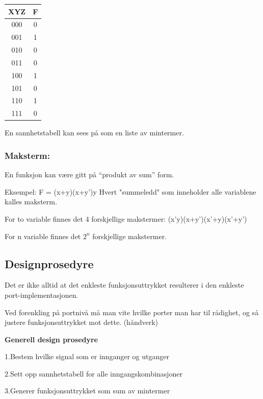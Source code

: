 \documentclass{article}
\begin{document}
	
	\begin{center}
		\begin{tabular}{|c|c|}
			\hline
			XYZ & F \\ \hline
			000 & 0  \\ \hline
			001 & \color{Aquamarine}1  \\ \hline 
			010 & 0  \\ \hline
			011 & 0  \\ \hline 
			100 & \color{BurntOrange}1  \\ \hline
			101 & 0  \\ \hline
			110 & \color{WildStrawberry}1  \\ \hline
			111 & 0  \\ \hline
			
		\end{tabular}
	\end{center}
	
	En sannhetstabell kan sees på som en liste av mintermer.
	
	\subsubsection{Maksterm:}
	
	En funksjon kan være gitt på “produkt av sum” form.
	
	Eksempel: F = (x+y)(x+y')y 
	Hvert "summeledd" som inneholder alle variablene kalles maksterm.
	
	For to variable finnes det 4 forskjellige makstermer:
	(x'y)(x+y')(x'+y)(x'+y')
	
	For n variable finnes det $2^n$ forskjellige makstermer.
	
	\subsection{Designprosedyre }
	
	Det er ikke alltid at det enkleste funksjonsuttrykket resulterer i den enkleste port-implementasjonen.
	
	Ved forenkling på portnivå må man vite hvilke porter man har til rådighet, og så justere funksjonsuttrykket mot dette. (håndverk) 
	
	\textbf{Generell design	prosedyre}
	
	1.Bestem hvilke signal som er innganger og 
	utganger
	
	2.Sett opp sannhetstabell for alle 
	inngangskombinasjoner
	
	3.Generer funksjonsuttrykket som sum av 
	mintermer 
	
\end{document}
